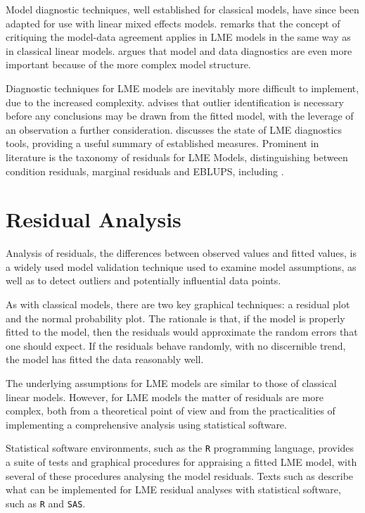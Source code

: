 \documentclass[12pt, a4paper]{report}
\theoremstyle{definition}
\theoremstyle{remark}
\begin{document}
Model diagnostic techniques, well established for classical models, have since been adapted for use with linear mixed effects models. \citet{schabenberger} remarks that the concept of critiquing the model-data agreement applies in LME models in the same way as in classical linear models. \citet{west} argues that model and data diagnostics are even more important because of the more complex model structure. 


Diagnostic techniques for LME models are inevitably more difficult to implement, due to the increased complexity. \citet{Christensen} advises that outlier identification is necessary before any conclusions may be drawn from the fitted model, with the leverage of an observation a further consideration. \citet{schabenberger} discusses the state of LME diagnostics tools, providing a useful summary of established measures. Prominent in literature is the taxonomy of residuals for LME Models, distinguishing between condition residuals, marginal residuals and EBLUPS, including \citet{hilden1995, schabenberger, west, NobreSinger2007}. 


\section{Residual Analysis}
Analysis of residuals, the differences between observed values and fitted values, is a widely used model validation technique used to examine model assumptions, as well as to detect outliers and potentially influential data points. 

As with classical models, there are two key graphical techniques: a residual plot and the normal probability plot. The rationale is that, if the model is properly fitted to the model, then the residuals would approximate the random errors that one should expect. If the residuals behave randomly, with no discernible trend, the model has fitted the data reasonably well. 

The underlying assumptions for LME models are similar to those of classical linear models. However, for LME models the matter of residuals are more complex, both from a theoretical point of view and from the practicalities of implementing a comprehensive analysis using statistical software.

Statistical software environments, such as the \texttt{R} programming language, provides a suite of tests and graphical procedures for appraising a fitted LME model, with several of these procedures analysing the model residuals. Texts such as \citet{PB,west,Galecki} describe what can be implemented for LME residual analyses with statistical software, such as \texttt{R} and \texttt{SAS}.
\end{document}
